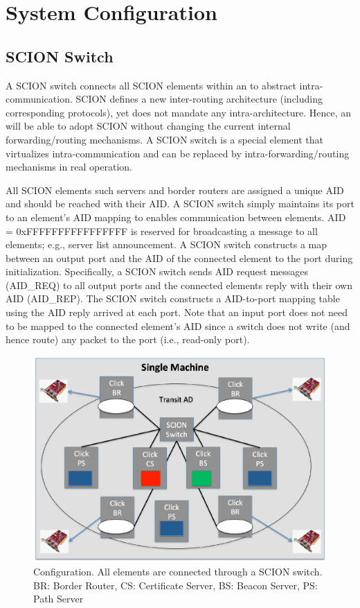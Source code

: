 \section{System Configuration}\label{sec:system-configuration}

\subsection{SCION Switch}
A SCION switch connects all SCION elements within an \AD to abstract intra-\AD communication. SCION defines a new inter-\AD routing architecture (including corresponding protocols), yet does not mandate any intra-\AD architecture. Hence, an \AD will be able to adopt SCION without changing the current internal forwarding/routing mechanisms. A SCION switch is a special element that virtualizes intra-\AD communication and can be replaced by intra-\AD forwarding/routing mechanisms in real operation.

All SCION elements such servers and border routers are assigned a unique AID and should be reached with their AID. A SCION switch simply maintains its port to an element's AID mapping to enables communication between elements. AID = 0xFFFFFFFFFFFFFFFF is reserved for broadcasting a message to all elements; e.g., server list announcement. A SCION switch constructs a map between an output port and the AID of the connected element to the port during initialization. Specifically, a SCION switch sends AID request messages (AID\_REQ) to all output ports and the connected elements reply with their own AID (AID\_REP). The SCION switch constructs a AID-to-port mapping table using the AID reply arrived at each port. Note that an input port does not need to be mapped to the connected element's AID since a switch does not write (and hence route) any packet to the port (i.e., read-only port).

\begin{figure}[ht]
\centering
\includegraphics[width=.8\columnwidth]{./fig/configuration.eps}
\caption{Configuration. All elements are connected through a SCION switch.\newline
BR: Border Router, CS: Certificate Server, BS: Beacon Server, PS: Path Server}\label{fig:configuration}
\end{figure}


